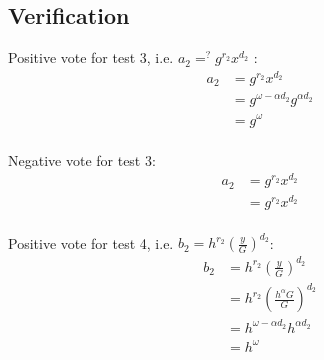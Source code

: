 


\subsection{Verification}
Positive vote for test 3, i.e. $a_2 =^{?} g^{r_2} x^{d_2}$  :
\begin{equation}
  \begin{split}
    a_2 & = g^{r_2} x^{d_2} \\
    & = g^{\omega - \alpha d_2}  g^{\alpha d_2} \\
    & = g^{\omega}  \\
  \end{split}
\end{equation}

Negative vote for test 3:
\begin{equation}
  \begin{split}
    a_2 & = g^{r_2} x^{d_2} \\
    & = g^{r_2}  x^{d_2}\\   %
  \end{split}
\end{equation}


Positive vote for test 4, i.e. $b_2 = h^{r_2} (\frac{y}{G})^{d_2}$:
\begin{equation}
\begin{split}
b_2 & = h^{r_2} (\frac{y}{G})^{d_2} \\
& =  h^{r_2} (\frac{ h^{\alpha}G }{G})^{d_2} \\
& = h^{\omega - \alpha d_2 } h^{\alpha d_2}  \\
&= h^{\omega}
\end{split}
\end{equation}



